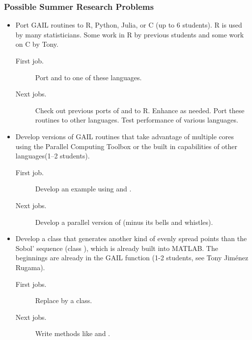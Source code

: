 \documentclass[10pt,compress,xcolor={usenames,dvipsnames}]{beamer} %
\begin{document}
\begin{frame}[allowframebreaks]
\frametitle{Possible Summer Research Problems}

\begin{itemize}
\item Port GAIL routines to R, Python, Julia, or C (up to 6 students).  R is used by many 
statisticians.  Some work in R by previous students and some work on C by Tony.
\begin{description}
\item[First job.] Port  and  to one of 
these languages.
\item[Next jobs.] Check out previous ports of  and  to R.  Enhance as needed.
\newline Port these routines to other languages.
\newline Test performance of various languages.
\end{description}

\item Develop versions of GAIL routines that take advantage of multiple cores using the 
Parallel Computing Toolbox or the built in capabilities of other languages(1--2 students).  
\begin{description}
\item[First job.] Develop an example using  and .
\item[Next jobs.] Develop a parallel version of  (minus its bells and whistles).
\end{description}

\pagebreak

\item Develop a class  that generates another kind of evenly spread points than the Sobol' sequence (class ), which is already built into MATLAB. The beginnings are already in the GAIL function  (1-2 students, see Tony Jim\'enez Rugama).
\begin{description}
\item[First jobs.] Replace  by a class.
\item[Next jobs.] Write methods like  and .
\end{description}



\end{itemize}
\end{frame}
\end{document}
